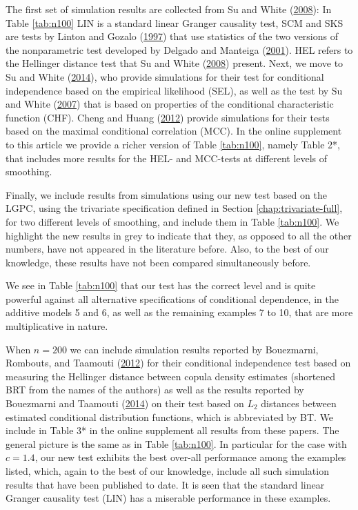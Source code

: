 \documentclass[
  12pt,
  letterpaper]{article}
\theoremstyle{definition}
\theoremstyle{definition}
\theoremstyle{definition}
\theoremstyle{remark}
\begin{document}
The first set of simulation results are collected from Su and White (\protect\hyperlink{ref-su2008nonparametric}{2008}): In Table \ref{tab:n100} LIN is a standard linear Granger causality test, SCM and SKS are tests by Linton and Gozalo (\protect\hyperlink{ref-linton1997conditional}{1997}) that use statistics of the two versions of the nonparametric test developed by Delgado and Manteiga (\protect\hyperlink{ref-delgado2001significance}{2001}). HEL refers to the Hellinger distance test that Su and White (\protect\hyperlink{ref-su2008nonparametric}{2008}) present. Next, we move to Su and White (\protect\hyperlink{ref-su2014testing}{2014}), who provide simulations for their test for conditional independence based on the empirical likelihood (SEL), as well as the test by Su and White (\protect\hyperlink{ref-su2007consistent}{2007}) that is based on properties of the conditional characteristic function (CHF). Cheng and Huang (\protect\hyperlink{ref-cheng2012conditional}{2012}) provide simulations for their tests based on the maximal conditional correlation (MCC). In the online supplement to this article we provide a richer version of Table \ref{tab:n100}, namely Table 2*, that includes more results for the HEL- and MCC-tests at different levels of smoothing.



Finally, we include results from simulations using our new test based on the LGPC, using the trivariate specification defined in Section \ref{chap:trivariate-full}, for two different levels of smoothing, and include them in Table \ref{tab:n100}. We highlight the new results in grey to indicate that they, as opposed to all the other numbers, have not appeared in the literature before. Also, to the best of our knowledge, these results have not been compared simultaneously before.

We see in Table \ref{tab:n100} that our test has the correct level and is quite powerful against all alternative specifications of conditional dependence, in the additive models 5 and 6, as well as the remaining examples 7 to 10, that are more multiplicative in nature.

When \(n=200\) we can include simulation results reported by Bouezmarni, Rombouts, and Taamouti (\protect\hyperlink{ref-bouezmarni2012nonparametric}{2012}) for their conditional independence test based on measuring the Hellinger distance between copula density estimates (shortened BRT from the names of the authors) as well as the results reported by Bouezmarni and Taamouti (\protect\hyperlink{ref-boue:taam:2014}{2014}) on their test based on \(L_2\) distances between estimated conditional distribution functions, which is abbreviated by BT. We include in Table 3* in the online supplement all results from these papers. The general picture is the same as in Table \ref{tab:n100}. In particular for the case with \(c=1.4\), our new test exhibits the best over-all performance among the examples listed, which, again to the best of our knowledge, include all such simulation results that have been published to date. It is seen that the standard linear Granger causality test (LIN) has a miserable performance in these examples.
\end{document}
